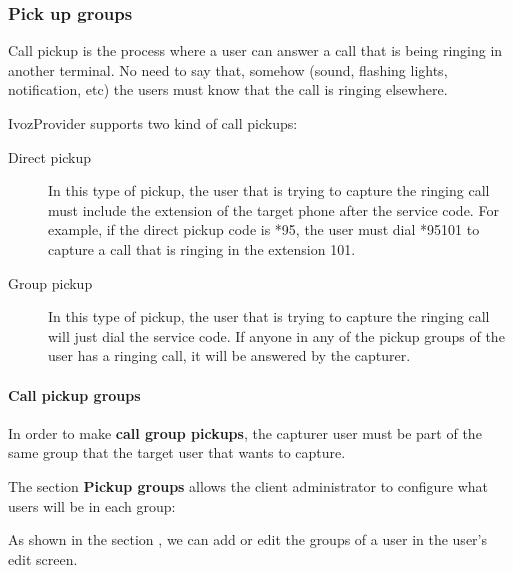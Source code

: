 \documentclass[letterpaper,10pt,spanish]{sphinxmanual}
\begin{document}
\subsubsection{Pick up groups}
\label{administration_portal/client/vpbx/user_configuration/pick_up_groups:capture-groups}\label{administration_portal/client/vpbx/user_configuration/pick_up_groups:pick-up-groups}\label{administration_portal/client/vpbx/user_configuration/pick_up_groups::doc}
Call pickup is the process where a user can answer a call that is being ringing
in another terminal. No need to say that, somehow (sound, flashing lights,
notification, etc) the users must know that the call is ringing elsewhere.

IvozProvider supports two kind of call pickups:
\begin{description}
\item[{Direct pickup}] \leavevmode{}\label{administration_portal/client/vpbx/user_configuration/pick_up_groups:term-direct-pickup}
In this type of pickup, the user that is trying to capture the ringing
call must include the extension of the target phone after the service
code. For example, if the direct pickup code is *95, the user must
dial *95101 to capture a call that is ringing in the extension 101.

\item[{Group pickup}] \leavevmode{}\label{administration_portal/client/vpbx/user_configuration/pick_up_groups:term-group-pickup}
In this type of pickup, the user that is trying to capture the ringing
call will just dial the service code. If anyone in any of the pickup
groups of the user has a ringing call, it will be answered by the
capturer.

\end{description}


\paragraph{Call pickup groups}
\label{administration_portal/client/vpbx/user_configuration/pick_up_groups:call-pickup-groups}
In order to make \textbf{call group pickups}, the capturer user must be part of the
same group that the target user that wants to capture.

The section \textbf{Pickup groups} allows the client administrator to configure
what users will be in each group:

As shown in the section {\hyperref[administration_portal/client/vpbx/users:users]{}}, we can add or edit the groups of a user
in the user's edit screen.
\end{document}
